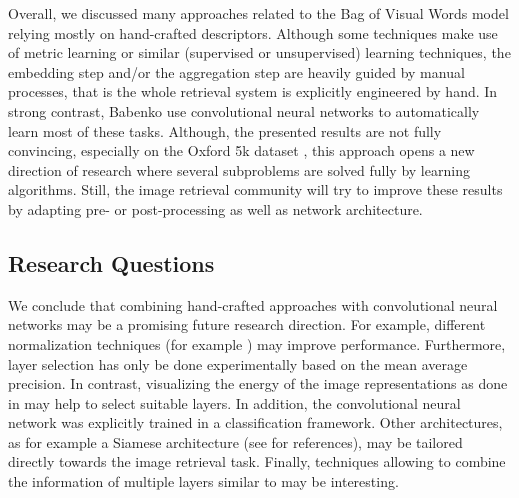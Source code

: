 Overall, we discussed many approaches related to the Bag of Visual Words model \cite{SivicZisserman:2003} relying mostly on hand-crafted descriptors. Although some techniques make use of metric learning or similar (supervised or unsupervised) learning techniques, the embedding step and/or the aggregation step are heavily guided by manual processes, that is the whole retrieval system is explicitly engineered by hand.
In strong contrast, Babenko \etal use convolutional neural networks to automatically learn most of these tasks. Although, the presented results are not fully convincing, especially on the Oxford 5k dataset \cite{PhilbinChumIsardSivicZisserman:2007}, this approach opens a new direction of research where several subproblems are solved fully by learning algorithms. Still, the image retrieval community will try to improve these results by adapting pre- or post-processing as well as network architecture.

\subsection{Research Questions}

We conclude that combining hand-crafted approaches with convolutional neural networks may be a promising future research direction. For example, different normalization techniques (for example \cite{ArandjelovicZisserman:2013}) may improve performance. Furthermore, layer selection has only be done experimentally based on the mean average precision. In contrast, visualizing the energy of the image representations as done in \cite{ArandjelovicZisserman:2013} may help to select suitable layers. In addition, the convolutional neural network was explicitly trained in a classification framework. Other architectures, as for example a Siamese architecture (see \cite{BabenkoSlesarevChigorinLempitsky:2014} for references), may be tailored directly towards the image retrieval task. Finally, techniques allowing to combine the information of multiple layers similar to \cite{GeKeSun:2013} may be interesting.
